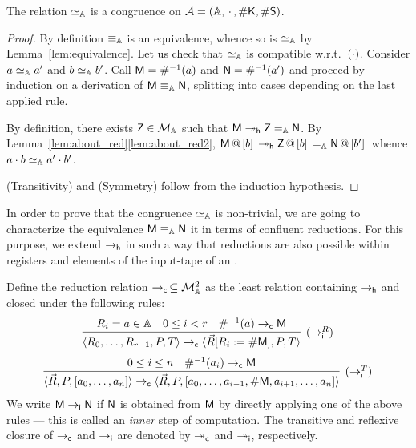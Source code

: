 \begin{lem}
The relation $\sima$ is a congruence on $\cA= (\Addrs,\App{\,}{\,},\Lookup\mach{K},\Lookup\mS)$.
\end{lem}
\begin{proof}
By definition $\equiva$ is an equivalence, whence so is $\sima$ by Lemma~\ref{lem:equivalence}.
Let us check that $\sima$ is compatible w.r.t.\ $(\App{}{})$.
Consider $a \sima a'$ and $b\sima b'$.
Call $\mM = \Lookinv{a}$ and $\mN = \Lookinv{a'}$ and proceed by induction on a derivation of $\mM\equiva\mN$, splitting into cases depending on the last applied rule.

\redrule{} By definition, there exists $\mZ\in\cM$ such that $\mM\reddh \mach Z =_\Addrs \mN$. By Lemma~\ref{lem:about_red}\ref{lem:about_red2}, $\append{\mM}{b} \reddh \append{\mZ}{b} =_\Addrs \append{\mN}{b'}$ whence $\App{a}{b}\sima\App{a'}{b'}$.

(Transitivity) and (Symmetry) follow from the induction hypothesis.
\end{proof}

In order to prove that the congruence $\sima$ is non-trivial, we are going to characterize the equivalence $\mM\equiva\mN$ it in terms of confluent reductions.
For this purpose, we extend $\redh$ in such a way that reductions are also possible within registers and elements of the input-tape of an \am.

\begin{defi} Define the reduction relation $\red[c]\,\subseteq\cM^2$ as the least relation containing $\redh$ and closed under the following rules:
\begin{gather*}
\infer[{(\red[i]^R)}]{\tuple{R_0,\dots,R_{r-1},P,T} \red[c] \tuple{\vec R\repl{R_i}{\Lookup\mM},P,T}}{R_i = a\in\Addrs&0\le i<r& \Lookinv{a}\red \mM}\\[3pt]
\infer[{(\red[i]^T)}]{\tuple{\vec R,P,[a_0,\dots,a_n]} \red[c] \tuple{\vec R,P,[a_0,\dots,a_{i-1},\Lookup\mM,a_{i+1},\dots,a_n]}}{0\le i\le n& \Lookinv{a_i}\red \mM}
\end{gather*}
We write $\mM\red[i]\mN$ if $\mN$ is obtained from $\mM$ by directly applying one of the above rules --- this is called an \emph{inner} step of computation.
The transitive and reflexive closure of $\red$ and $\red[i]$ are denoted by $\redd$ and $\redd[i]$, respectively.
\end{defi}


